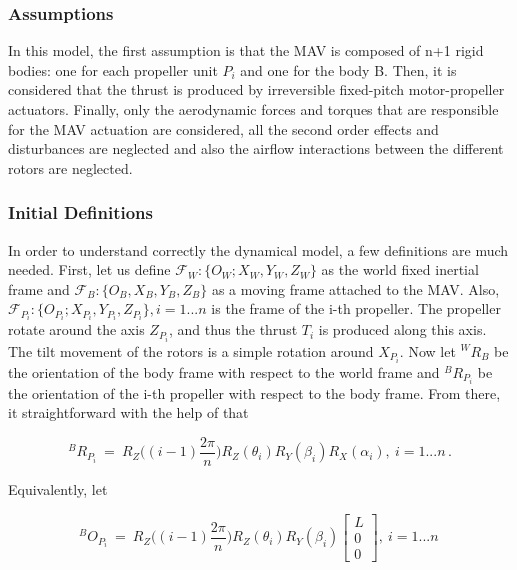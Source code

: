 \subsubsection{Assumptions}
\label{sec:assumptions}
In this model, the first assumption is that the MAV is composed of n+1 rigid bodies:
one for each propeller unit $P_i$ and one for the body B. Then, it is considered that
the thrust is produced by irreversible fixed-pitch motor-propeller actuators. Finally,
only the aerodynamic forces and torques that are responsible for the MAV actuation
are considered, all the second order effects and disturbances are neglected and
also the airflow interactions between the different rotors are neglected.

\subsubsection{Initial Definitions}
\label{sec:definitions}
In order to understand correctly the dynamical model, a few definitions are much
needed. First, let us define $\mathcal{F}_{W} : \{O_{W}; X_{W},  Y_{W},  Z_{W}\}$
as the world fixed inertial frame and $\mathcal{F}_{B}: \{O_{B}, X_{B},  Y_{B},
Z_{B}\}$
as a moving frame attached to the MAV. Also, $\mathcal{F}_{P_{i}} : \{O_{P_{i}};
X_{P_{i}}, Y_{P_{i}},  Z_{P_{i}}\}, i = 1...n$ is the frame of the i-th propeller.
The propeller rotate around the axis $Z_{P_{i}}$, and thus the thrust $T_{i}$ is
produced along this axis. The tilt movement of the rotors is a simple rotation
around $X_{P_{i}}$. Now let $^{W}R_{B}$ be the orientation of the body frame
with respect to the world frame and $^{B}R_{P_{i}}$ be the orientation of the
i-th propeller with respect to the body frame. From there, it
straightforward with the help of  that

\begin{equation}
  \label{rot_b_pi}
  ^{B}R_{P_{i}} \ = \ R_{Z}\bigg((i-1)\frac{2\pi}{n}\bigg) R_Z(\theta_i)
  R_Y(\beta_i) R_{X}(\alpha_{i}),\  i = 1...n\, .
\end{equation}

Equivalently, let

\begin{equation}
  \label{O_pi}
  ^{B}O_{P_{i}} \ = \ R_{Z}\bigg((i-1)\frac{2\pi}{n}\bigg) R_Z(\theta_i) R_Y(\beta_i)
  \begin{bmatrix}
    L \\
    0 \\
    0
  \end{bmatrix}
  ,\   i = 1...n \,
\end{equation}

